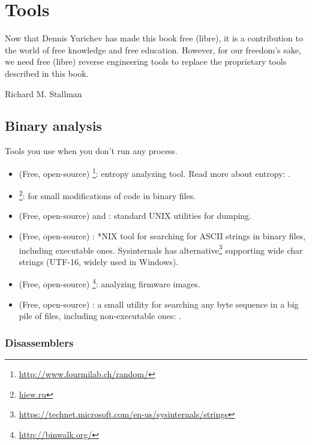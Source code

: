 \chapter{Tools}

\epigraph{Now that Dennis Yurichev has made this book free (libre), it is a
contribution to the world of free knowledge and free education.
However, for our freedom's sake, we need free (libre) reverse
engineering tools to replace the proprietary tools described in this book.}{Richard M. Stallman}

\section{Binary analysis}

Tools you use when you don't run any process.


\begin{itemize}
\item
(Free, open-source) \footnote{\url{http://www.fourmilab.ch/random/}}: entropy analyzing tool.
Read more about entropy: .

\item
\label{Hiew}
\footnote{\href{http://go.yurichev.com/17035}{hiew.ru}}:
for small modifications of code in binary files.

\item (Free, open-source)  and : standard UNIX utilities for dumping.

\item (Free, open-source) : *NIX tool for searching for ASCII strings in binary files, including executable ones.
Sysinternals has alternative\footnote{\url{https://technet.microsoft.com/en-us/sysinternals/strings}}
supporting wide char strings (UTF-16, widely used in Windows).

\item (Free, open-source) \footnote{\url{http://binwalk.org/}}: analyzing firmware images.

\item
{}
(Free, open-source) :
a small utility for searching any byte sequence in a big pile of files, 
including non-executable ones: \BGREPURL.
\end{itemize}

\subsection{Disassemblers}

